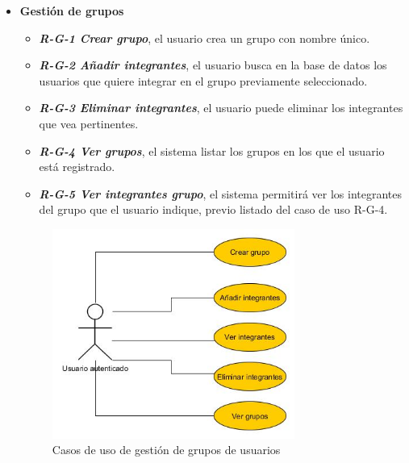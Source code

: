 \begin{itemize}
\item \textbf{Gestión de grupos}
\begin{itemize}
\item\textbf{ \textit{R-G-1 Crear grupo}}, el usuario crea un grupo con nombre único.
\item\textbf{\textit{ R-G-2 Añadir integrantes}}, el usuario busca en la base de datos los usuarios que quiere integrar en el grupo previamente seleccionado.
\item \textbf{\textit{R-G-3 Eliminar integrantes}}, el usuario puede eliminar los integrantes que vea pertinentes.
\item \textbf{\textit{R-G-4 Ver grupos}}, el sistema listar los grupos en los que el usuario está registrado.
\item \textbf{\textit{R-G-5 Ver integrantes grupo}}, el sistema permitirá ver los integrantes del grupo que el usuario indique, previo listado del caso de uso R-G-4. 

\end{itemize} 

\begin{figure}[H]
		\centering
		\includegraphics[width=0.75\textwidth] {grupo.jpg}
		\caption{Casos de uso de gestión de grupos de usuarios }\label{fig:grupo}
	\end{figure}
	
	
	

\end{itemize}
